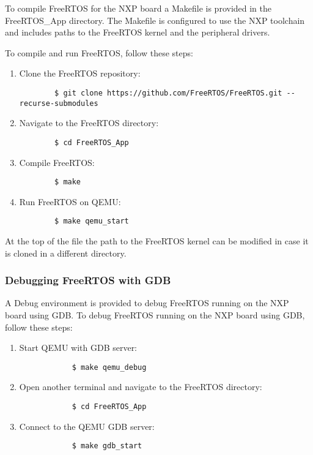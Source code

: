 To compile FreeRTOS for the NXP board a Makefile is provided in the FreeRTOS\_App directory. The Makefile is configured to use the NXP toolchain and includes paths to the FreeRTOS kernel and the peripheral drivers.

To compile and run FreeRTOS, follow these steps:
\begin{enumerate}
    \item {Clone the FreeRTOS repository:
    \begin{verbatim}
        $ git clone https://github.com/FreeRTOS/FreeRTOS.git --recurse-submodules
      \end{verbatim}
    }
    \item {Navigate to the FreeRTOS directory:
    \begin{verbatim}
        $ cd FreeRTOS_App
      \end{verbatim}
    }
    \item {Compile FreeRTOS:
    \begin{verbatim}
        $ make
      \end{verbatim}
    }
    \item {Run FreeRTOS on QEMU:
    \begin{verbatim}
        $ make qemu_start
      \end{verbatim}
    }
\end{enumerate}

At the top of the file the path to the FreeRTOS kernel can be modified in case it is cloned in a different directory. 

\subsubsection{Debugging FreeRTOS with GDB}

A Debug environment is provided to debug FreeRTOS running on the NXP board using GDB. 
To debug FreeRTOS running on the NXP board using GDB, follow these steps:

\begin{enumerate}
    \item {Start QEMU with GDB server:
        \begin{verbatim}
            $ make qemu_debug
        \end{verbatim}
    }
    \item {Open another terminal and navigate to the FreeRTOS directory:
        \begin{verbatim}
            $ cd FreeRTOS_App
        \end{verbatim}
    }
    \item {Connect to the QEMU GDB server:
        \begin{verbatim}
            $ make gdb_start
        \end{verbatim}
    }
\end{enumerate}

